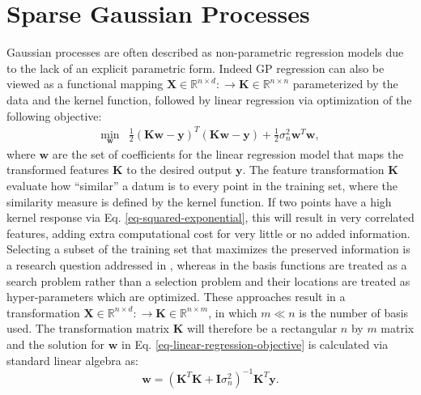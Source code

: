 \documentclass[useAMS,usenatbib,fleqn]{mn2e}
\begin{document}
\section{Sparse Gaussian Processes}
\label{sec-sparse-gaussian-processes}
Gaussian processes are often described as non-parametric regression models due to the lack of an explicit parametric form. Indeed GP regression can also be viewed as a functional mapping $\mathbf{X}\in \mathbb{R}^{n\times d}:\rightarrow \mathbf{K}\in \mathbb{R}^{n\times n}$ parameterized by the data and the kernel function, followed by linear regression via optimization of the following objective:
\begin{equation}
\label{eq-linear-regression-objective}
\begin{array}{lcl}
\underset{\mathbf{w}}{\text{min}} &\frac{1}{2}\left ( \mathbf{K}\mathbf{w}-\mathbf{y} \right )^{T}\left( \mathbf{K}\mathbf{w}-\mathbf{y} \right )+\frac{1}{2}\sigma_{n}^{2}\mathbf{w}^{T}\mathbf{w},
\end{array}
\end{equation}
where $\mathbf{w}$ are the set of coefficients for the linear regression model that maps the transformed features $\mathbf{K}$ to the desired output $\mathbf{y}$. The feature transformation $\mathbf{K}$ evaluate how ``similar'' a datum is to every point in the training set, where the similarity measure is defined by the kernel function. If two points have a high kernel response via  Eq. \eqref{eq-squared-exponential}, this will result in very correlated features, adding extra computational cost for very little or no added information. Selecting a subset of the training set that maximizes the preserved information is a research question addressed in \citet{foster2009}, whereas in \citet{snelson2005} the basis functions are treated as a search problem rather than a selection problem and their locations are treated as hyper-parameters which are optimized. These approaches result in a transformation $\mathbf{X}\in \mathbb{R}^{n\times d}:\rightarrow \mathbf{K}\in \mathbb{R}^{n\times m}$, in which $m\ll n$ is the number of basis used. The transformation matrix $\mathbf{K}$ will therefore be a rectangular $n$ by $m$ matrix and the solution for $\mathbf{w}$ in  Eq. \eqref{eq-linear-regression-objective} is calculated via standard linear algebra as:
\begin{equation}
\label{eq-linear-regression-objective-rectangular}
\mathbf{w} = \left(\mathbf{K}^{T}\mathbf{K}+\mathbf{I}\sigma_{n}^{2} \right)^{-1}\mathbf{K}^{T}\mathbf{y}.
\end{equation}
\end{document}
